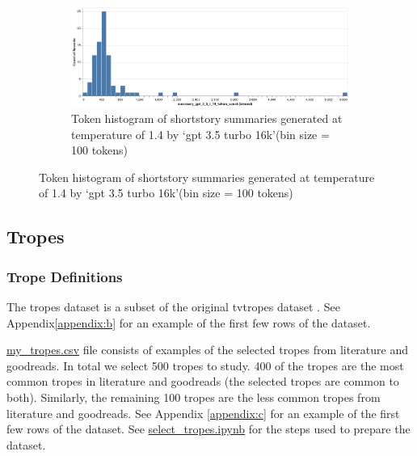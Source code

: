 \documentclass[11pt]{article}
\begin{document}
\begin{figure}[h]
\begin{subfigure}[t]{.95\textwidth}
  \includegraphics[scale=0.5]{summary2_tokens.png}
  \caption{Token histogram of shortstory summaries generated at temperature of 1.4 by `gpt 3.5 turbo 16k'(bin size = 100 tokens)}
\end{subfigure}
\end{figure}

\subsection{Tropes}
\subsubsection{Trope Definitions}
The tropes dataset is a subset of the original tvtropes dataset \cite{gala-etal-2020-analyzing}. See Appendix\ref{appendix:b} for an example of the first few rows of the dataset.

\href{https://github.com/armsp/trama/blob/main/dataset/my_tropes.csv}{my\_tropes.csv} file consists of examples of the selected tropes from literature and goodreads. In total we select 500 tropes to study. 400 of the tropes are the most common tropes in literature and goodreads (the selected tropes are common to both). Similarly, the remaining 100 tropes are the less common tropes from literature and goodreads. See Appendix \ref{appendix:c} for an example of the first few rows of the dataset. See \href{https://github.com/armsp/trama/blob/main/select%20tropes.ipynb}{select\_tropes.ipynb} for the steps used to prepare the dataset.
\end{document}
